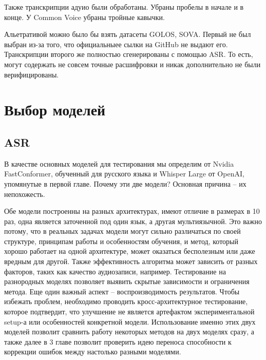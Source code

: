 Также транскрипции адуио были обработаны.
Убраны пробелы в начале и в конце.
У Common Voice убраны тройные кавычки.

Альетративой можно было бы взять датасеты GOLOS\cite{karpov2021golos}, SOVA\cite{sova2021rudevices}.
Первый не был выбран из-за того, что официальныее сылки на GitHub не выдают его.
Транскрипции второго же полностью сгенерированы с помощью ASR.
То есть, могут содержать не совсем точные расшифровки и никак дополнительно не были верифицированы.

\section{Выбор моделей}
\subsection{ASR}

В качестве основных моделей для тестирования мы определим от Nvidia FastConformer, обученный для русского языка и Whisper Large от OpenAI, упомянутые в первой главе.
Почему эти две модели? Основная причина -- их непохожесть.

Обе модели построенны на разных архитектурах, имеют отличие в размерах в 10 раз, одна является заточенной под один язык, а другая мультиязычной.
Это важно потому, что в реальных задачах модели могут сильно различаться по своей структуре, принципам работы и особенностям обучения, и метод, который хорошо работает на одной архитектуре, может оказаться бесполезным или даже вредным для другой.
Также эффективность алгоритма может  зависить от разных факторов, таких как качество аудиозаписи, например.
Тестирование на разнородных моделях позволяет выявить скрытые зависимости и ограничения метода.
Еще один важный аспект -- воспроизводимость результатов.
Чтобы избежать проблем, необходимо проводить кросс-архитектурное тестирование, которое подтвердит, что улучшение не является артефактом экспериментальной setup-а или особенностей конкретной модели.
Использование именно этих двух моделей позволит сравнить работу некоторых методов на двух моделях сразу, а также далее в 3 главе позволит проверить идею переноса способности к коррекции ошибок между настолько разными моделями.

